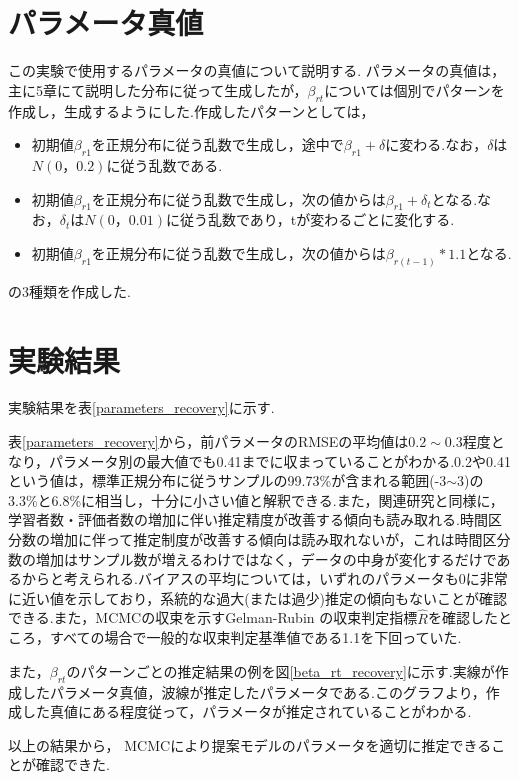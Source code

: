 \documentclass[a4paper,11pt,oneside,openany]{jsbook}
\begin{document}
\section{パラメータ真値}
この実験で使用するパラメータの真値について説明する.
パラメータの真値は，主に5章にて説明した分布に従って生成したが，$\beta_{rt}$については個別でパターンを作成し，生成するようにした.作成したパターンとしては，
\begin{itemize}
\item 初期値$\beta_{r1}$を正規分布に従う乱数で生成し，途中で$\beta_{r1}+\delta$に変わる.なお，$\delta$は$N(0，0.2)$に従う乱数である.
\item 初期値$\beta_{r1}$を正規分布に従う乱数で生成し，次の値からは$\beta_{r1}+\delta_t$となる.なお，$\delta_t$は$N(0，0.01)$に従う乱数であり，tが変わるごとに変化する.
\item 初期値$\beta_{r1}$を正規分布に従う乱数で生成し，次の値からは$\beta_{r(t-1)}*1.1$となる.
\end{itemize}
の3種類を作成した.
\section{実験結果}
実験結果を表\ref{parameters_recovery}に示す.

表\ref{parameters_recovery}から，前パラメータのRMSEの平均値は$0.2\sim0.3$程度となり，パラメータ別の最大値でも0.41までに収まっていることがわかる.0.2や0.41という値は，標準正規分布に従うサンプルの99.73\%が含まれる範囲(-3$\sim$3)の3.3\%と6.8\%に相当し，十分に小さい値と解釈できる.また，関連研究と同様に，学習者数・評価者数の増加に伴い推定精度が改善する傾向も読み取れる.時間区分数の増加に伴って推定制度が改善する傾向は読み取れないが，これは時間区分数の増加はサンプル数が増えるわけではなく，データの中身が変化するだけであるからと考えられる.バイアスの平均については，いずれのパラメータも0に非常に近い値を示しており，系統的な過大(または過少)推定の傾向もないことが確認できる.また，MCMCの収束を示すGelman-Rubin の収束判定指標$ \hat{R} $\cite{RhatRubin,RhatCarlin}を確認したところ，すべての場合で一般的な収束判定基準値である1.1を下回っていた.

また，$\beta_{rt}$のパターンごとの推定結果の例を図\ref{beta_rt_recovery}に示す.実線が作成したパラメータ真値，波線が推定したパラメータである.このグラフより，作成した真値にある程度従って，パラメータが推定されていることがわかる.

以上の結果から， MCMCにより提案モデルのパラメータを適切に推定できることが確認できた.
\end{document}
